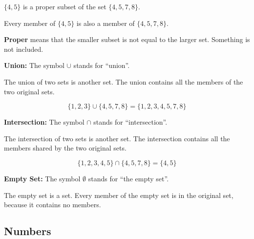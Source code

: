\documentclass{ximera}
\begin{document}
\begin{center}

$\{ 4, 5 \}$ is a proper subset of the set $\{ 4, 5, 7, 8 \}$.  

Every member of $\{ 4, 5 \}$ is also a member of $\{ 4, 5, 7, 8 \}$. 

\end{center}





\textbf{Proper} means that the smaller subset is not equal to the larger set. Something is not included.












\textbf{\textcolor{blue!55!black}{Union:}}  The symbol $\cup$ stands for ``union''.


The union of two sets is another set.  The union contains all the members of the two original sets.

\[
\{ 1, 2, 3 \} \cup \{ 4, 5, 7, 8 \} = \{ 1, 2, 3, 4, 5, 7, 8 \}
\]








\textbf{\textcolor{blue!55!black}{Intersection:}}  The symbol $\cap$ stands for ``intersection''.

The intersection of two sets is another set.  The intersection contains all the members shared by the two original sets.

\[
\{ 1, 2, 3, 4, 5 \} \cap \{ 4, 5, 7, 8 \} = \{ 4, 5 \}
\]








\textbf{\textcolor{blue!55!black}{Empty Set:}}  The symbol $\emptyset$ stands for ``the empty set''.

The empty set is a set.  Every member of the empty set is in the original set, because it contains no members.














\subsection*{Numbers}
\end{document}

